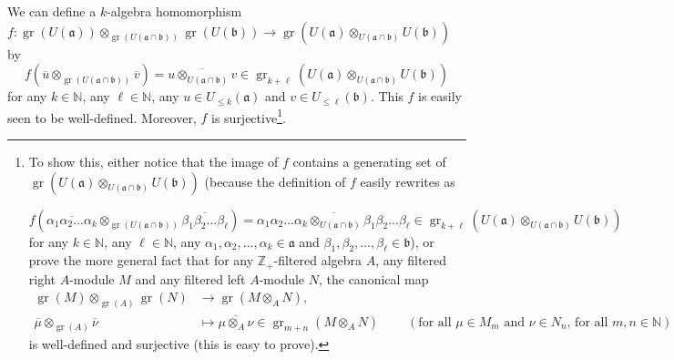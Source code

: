 \documentclass
[numbers=enddot,12pt,final,onecolumn,german,notitlepage]{scrartcl}%
\theoremstyle{definition}
\begin{document}
We can define a $k$-algebra homomorphism $f:\operatorname*{gr}\left(  U\left(
\mathfrak{a}\right)  \right)  \otimes_{\operatorname*{gr}\left(  U\left(
\mathfrak{a}\cap\mathfrak{b}\right)  \right)  }\operatorname*{gr}\left(
U\left(  \mathfrak{b}\right)  \right)  \rightarrow\operatorname*{gr}\left(
U\left(  \mathfrak{a}\right)  \otimes_{U\left(  \mathfrak{a}\cap
\mathfrak{b}\right)  }U\left(  \mathfrak{b}\right)  \right)  $ by
\[
f\left(  \overline{u}\otimes_{\operatorname*{gr}\left(  U\left(
\mathfrak{a}\cap\mathfrak{b}\right)  \right)  }\overline{v}\right)
=\overline{u\otimes_{U\left(  \mathfrak{a}\cap\mathfrak{b}\right)  }v}%
\in\operatorname*{gr}\nolimits_{k+\ell}\left(  U\left(  \mathfrak{a}\right)
\otimes_{U\left(  \mathfrak{a}\cap\mathfrak{b}\right)  }U\left(
\mathfrak{b}\right)  \right)
\]
for any $k\in\mathbb{N}$, any $\ell\in\mathbb{N}$, any $u\in U_{\leq k}\left(
\mathfrak{a}\right)  $ and $v\in U_{\leq\ell}\left(  \mathfrak{b}\right)  $.
This $f$ is easily seen to be well-defined. Moreover, $f$ is
surjective\footnote{To show this, either notice that the image of $f$ contains
a generating set of $\operatorname*{gr}\left(  U\left(  \mathfrak{a}\right)
\otimes_{U\left(  \mathfrak{a}\cap\mathfrak{b}\right)  }U\left(
\mathfrak{b}\right)  \right)  $ (because the definition of $f$ easily rewrites
as
\par%
\[
f\left(  \overline{\alpha_{1}\alpha_{2}...\alpha_{k}}\otimes
_{\operatorname*{gr}\left(  U\left(  \mathfrak{a}\cap\mathfrak{b}\right)
\right)  }\overline{\beta_{1}\beta_{2}...\beta_{\ell}}\right)  =\overline
{\alpha_{1}\alpha_{2}...\alpha_{k}\otimes_{U\left(  \mathfrak{a}%
\cap\mathfrak{b}\right)  }\beta_{1}\beta_{2}...\beta_{\ell}}\in
\operatorname*{gr}\nolimits_{k+\ell}\left(  U\left(  \mathfrak{a}\right)
\otimes_{U\left(  \mathfrak{a}\cap\mathfrak{b}\right)  }U\left(
\mathfrak{b}\right)  \right)
\]
for any $k\in\mathbb{N}$, any $\ell\in\mathbb{N}$, any $\alpha_{1},\alpha
_{2},...,\alpha_{k}\in\mathfrak{a}$ and $\beta_{1},\beta_{2},...,\beta_{\ell
}\in\mathfrak{b}$), or prove the more general fact that for any $\mathbb{Z}%
_{+}$-filtered algebra $A$, any filtered right $A$-module $M$ and any filtered
left $A$-module $N$, the canonical map%
\begin{align*}
\operatorname*{gr}\left(  M\right)  \otimes_{\operatorname*{gr}\left(
A\right)  }\operatorname*{gr}\left(  N\right)   &  \rightarrow
\operatorname*{gr}\left(  M\otimes_{A}N\right)  ,\\
\overline{\mu}\otimes_{\operatorname*{gr}\left(  A\right)  }\overline{\nu}  &
\mapsto\overline{\mu\otimes_{A}\nu}\in\operatorname*{gr}\nolimits_{m+n}\left(
M\otimes_{A}N\right)  \ \ \ \ \ \ \ \ \ \ \left(  \text{for all }\mu\in
M_{m}\text{ and }\nu\in N_{n}\text{, for all }m,n\in\mathbb{N}\right)
\end{align*}
is well-defined and surjective (this is easy to prove).}.
\end{document}
